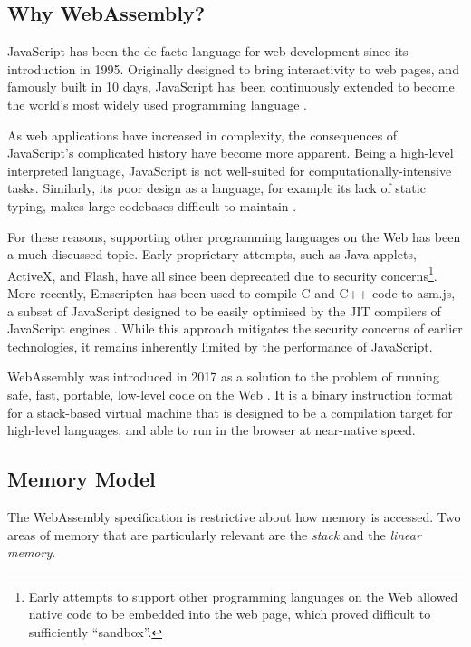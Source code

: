\subsection{Why WebAssembly?}

JavaScript has been the de facto language for web development since its introduction in 1995. Originally designed to bring interactivity to web pages, and famously built in 10 days, JavaScript has been continuously extended to become the world's most widely used programming language \cite{wirfs-brockJavaScriptfirst202020a}.

As web applications have increased in complexity, the consequences of JavaScript's complicated history have become more apparent. Being a high-level interpreted language, JavaScript is not well-suited for computationally-intensive tasks. Similarly, its poor design as a language, for example its lack of static typing, makes large codebases difficult to maintain \cite{ocarizajr.JavaScriptErrorsWild2011, biermanUnderstandingTypeScript2014}.

For these reasons, supporting other programming languages on the Web has been a much-discussed topic. Early proprietary attempts, such as Java applets, ActiveX, and Flash, have all since been deprecated due to security concerns\footnote{Early attempts to support other programming languages on the Web allowed native code to be embedded into the web page, which proved difficult to sufficiently ``sandbox''.}. More recently, Emscripten has been used to compile C and C++ code to asm.js, a subset of JavaScript designed to be easily optimised by the JIT compilers of JavaScript engines \cite{zakaiEmscriptenLLVMtoJavaScriptcompiler2011}. While this approach mitigates the security concerns of earlier technologies, it remains inherently limited by the performance of JavaScript.

WebAssembly was introduced in 2017 as a solution to the problem of running safe, fast, portable, low-level code on the Web \cite{haasBringingwebspeed2017}. It is a binary instruction format for a stack-based virtual machine that is designed to be a compilation target for high-level languages, and able to run in the browser at near-native speed.

\subsection{Memory Model}

\label{sec:wasm-memory-model}

The WebAssembly specification \cite{rossbergWebAssemblyCoreSpecification2022} is restrictive about how memory is accessed. Two areas of memory that are particularly relevant are the \emph{stack} and the \emph{linear memory}.

